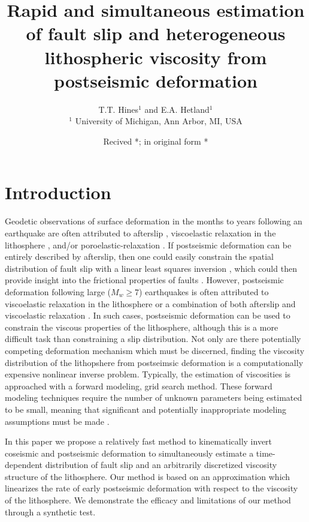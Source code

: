 \documentclass[extra]{gji}
\title[Estimation of slip and viscosity from postseismic
  deformation]{Rapid and simultaneous estimation of fault slip and
  heterogeneous lithospheric viscosity from postseismic deformation}
\author[T.T. Hines and E.A Hetland]{T.T. Hines$^1$ and
  E.A. Hetland$^1$\\ $^1$ University of Michigan, Ann Arbor, MI, USA}
\date{Recived *; in original form *}
\begin{document}
\label{firstpage}

\maketitle

\begin{summary}
\end{summary}

\begin{keywords}
\end{keywords}

\section{Introduction}
Geodetic observations of surface deformation in the months to years
following an earthquake are often attributed to afterslip
\citep[e.g.][]{M1991}, viscoelastic relaxation in the lithosphere
\citep[e.g.][]{NM1974}, and/or poroelastic-relaxation
\citep[e.g.][]{P1998,J2003}.  If postseismic deformation can be
entirely described by afterslip, then one could easily constrain the
spatial distribution of fault slip with a linear least squares
inversion \citep[e.g.][]{H1987,B2002,F2007}, which could then provide
insight into the frictional properties of faults
\citep[e.g.][]{H2006,B2009}.  However, postseismic deformation
following large ($M_w\geq$7) earthquakes is often attributed to
viscoelastic relaxation in the lithosphere
\citep[e.g.][]{HH2003,P2003,P2005} or a combination of both afterslip
and viscoelastic relaxation \citep[e.g.][]{F2006,H2009,J2009,R2015}.
In such cases, postseismic deformation can be used to constrain the
viscous properties of the lithosphere, although this is a more
difficult task than constraining a slip distribution.  Not only are
there potentially competing deformation mechanism which must be
discerned, finding the viscosity distribution of the lithopshere from
postseimsic deformation is a computationally expensive nonlinear
inverse problem.  Typically, the estimation of viscosities is
approached with a forward modeling, grid search method.  These forward
modeling techniques require the number of unknown parameters being
estimated to be small, meaning that significant and potentially
inappropriate modeling assumptions must be made \citep{RG2008,H2013}.

In this paper we propose a relatively fast method to kinematically
invert coseismic and postseismic deformation to simultaneously
estimate a time-dependent distribution of fault slip and an
arbitrarily discretized viscosity structure of the lithosphere.  Our
method is based on an approximation which linearizes the rate of early
postseismic deformation with respect to the viscosity of the
lithosphere.  We demonstrate the efficacy and limitations of our
method through a synthetic test.
\end{document}
